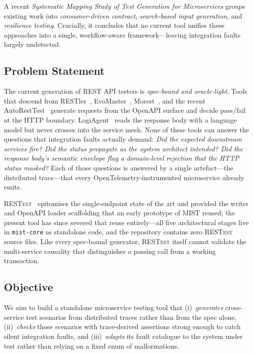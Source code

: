 \documentclass[conference]{IEEEtran}
\begin{document}
A recent \emph{Systematic Mapping Study of Test Generation for
Microservices} \cite{miao2025sms} groups existing work into
\textit{consumer-driven contract}, \textit{search-based input
generation}, and \textit{resilience testing}.  Crucially, it concludes
that no current tool unifies these approaches into a single,
workflow-aware framework—leaving integration faults largely
undetected.

\subsection*{Problem Statement}
The current generation of REST API testers is \emph{spec-bound and
oracle-light}.  Tools that descend from RESTler~\cite{atlidakis2019restler}, EvoMaster~\cite{arcuri2019restful},
Morest~\cite{liu2022morest}, and the recent AutoRestTest~\cite{stennett2025autoresttest,kim2024multiagent}
generate requests from the OpenAPI surface and decide pass/fail at the
HTTP boundary.  LogiAgent~\cite{zhang2025logiagent} reads the response body
with a language model but never crosses into the service mesh.  None of
these tools can answer the questions that integration faults actually
demand: \emph{Did the expected downstream services fire?  Did the status
propagate as the system architect intended?  Did the response body's
semantic envelope flag a domain-level rejection that the HTTP status
masked?}  Each of those questions
is answered by a single artefact---the distributed trace---that every
OpenTelemetry-instrumented microservice already emits.

\textsc{RESTest}~\cite{martin2019restest} epitomises the single-endpoint
state of the art and provided the writer and OpenAPI loader scaffolding
that an early prototype of \textsc{MIST} reused; the present tool has
since severed that reuse entirely---all five architectural stages live
in \texttt{mist-core} as standalone code, and the repository contains
zero \textsc{RESTest} source files.  Like every spec-bound generator,
\textsc{RESTest} itself cannot validate the multi-service causality that
distinguishes a passing call from a working transaction.

\subsection*{Objective}
We aim to build a standalone microservice testing tool that
(i)~\emph{generates} cross-service test scenarios from distributed traces
rather than from the spec alone, (ii)~\emph{checks} those scenarios with
trace-derived assertions strong enough to catch silent integration
faults, and (iii)~\emph{adapts} its fault catalogue to the system under
test rather than relying on a fixed enum of malformations.
\end{document}
